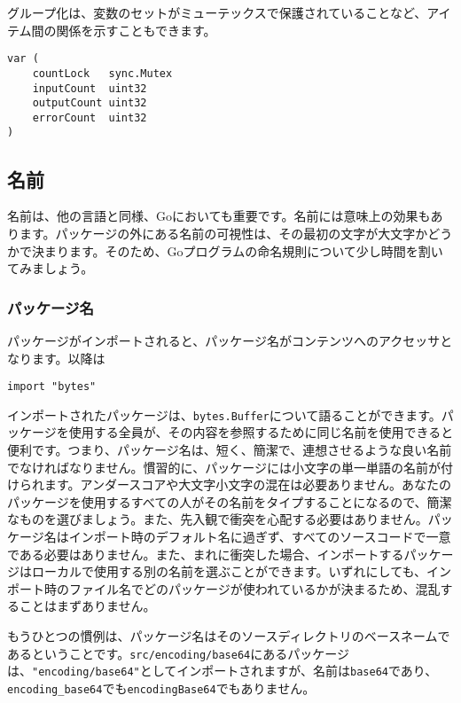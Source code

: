 \documentclass{jsarticle}
\begin{document}
グループ化は、変数のセットがミューテックスで保護されていることなど、アイテム間の関係を示すこともできます。

\begin{lstlisting}[numbers=none]
var (
    countLock   sync.Mutex
    inputCount  uint32
    outputCount uint32
    errorCount  uint32
)
\end{lstlisting}

\subsection{名前}

名前は、他の言語と同様、Goにおいても重要です。名前には意味上の効果もあります。パッケージの外にある名前の可視性は、その最初の文字が大文字かどうかで決まります。そのため、Goプログラムの命名規則について少し時間を割いてみましょう。

\subsubsection{パッケージ名}

パッケージがインポートされると、パッケージ名がコンテンツへのアクセッサとなります。以降は

\begin{lstlisting}[numbers=none]
import "bytes"
\end{lstlisting}

インポートされたパッケージは、\texttt{bytes.Buffer}について語ることができます。パッケージを使用する全員が、その内容を参照するために同じ名前を使用できると便利です。つまり、パッケージ名は、短く、簡潔で、連想させるような良い名前でなければなりません。慣習的に、パッケージには小文字の単一単語の名前が付けられます。アンダースコアや大文字小文字の混在は必要ありません。あなたのパッケージを使用するすべての人がその名前をタイプすることになるので、簡潔なものを選びましょう。また、先入観で衝突を心配する必要はありません。パッケージ名はインポート時のデフォルト名に過ぎず、すべてのソースコードで一意である必要はありません。また、まれに衝突した場合、インポートするパッケージはローカルで使用する別の名前を選ぶことができます。いずれにしても、インポート時のファイル名でどのパッケージが使われているかが決まるため、混乱することはまずありません。

もうひとつの慣例は、パッケージ名はそのソースディレクトリのベースネームであるということです。\texttt{src/encoding/base64}にあるパッケージは、\texttt{"encoding/base64"}としてインポートされますが、名前は\texttt{base64}であり、\texttt{encoding\_base64}でも\texttt{encodingBase64}でもありません。
\end{document}
